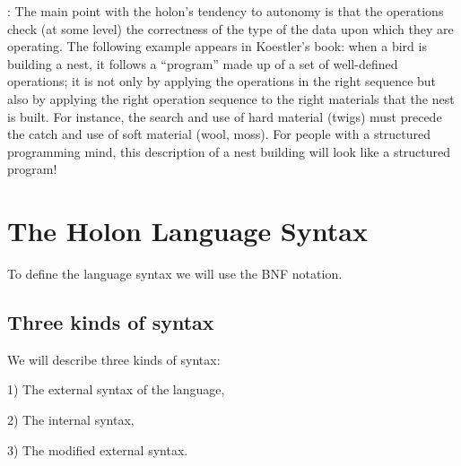 \documentclass[openany,nobib]{tufte-book}
\begin{document}
: The main point with the holon's tendency to autonomy is
that the operations check (at some level) the correctness of the type of the
data upon which they are operating. The following example appears in Koestler's
book: when a bird is building a nest, it follows a ``program'' made up of a set
of well-defined operations; it is not only by applying the operations in the
right sequence but also by applying the right operation sequence to the right
materials that the nest is built. For instance, the search and use of hard
material (twigs) must precede the catch and use of soft material (wool, moss).
For people with a structured programming mind, this description of a nest
building will look like a structured program!

\chapter{The Holon Language Syntax}

To define the language syntax we will use the BNF
notation.





\section{Three kinds of syntax}

We will describe three kinds of syntax:

1) The external syntax of the language,

2) The internal syntax,

3) The modified external syntax.

\smallskip
\end{document}
